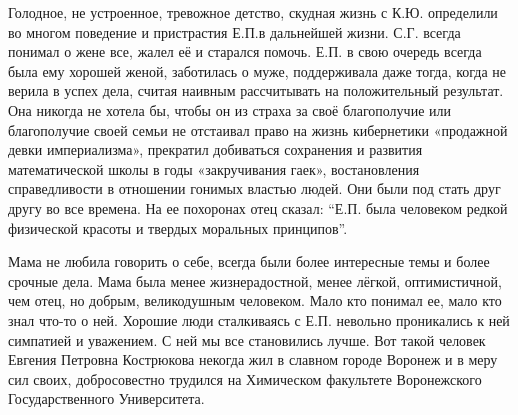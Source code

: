 Голодное, не устроенное, тревожное детство, скудная жизнь с К.Ю. определили во многом поведение и пристрастия Е.П.в дальнейшей жизни. С.Г. всегда понимал о жене все, жалел её и старался помочь. Е.П. в свою очередь всегда была ему хорошей женой, заботилась о муже, поддерживала даже тогда, когда не верила в успех дела, считая наивным рассчитывать на положительный результат. Она никогда не хотела бы, чтобы он из страха за своё благополучие или благополучие своей семьи не отстаивал право на жизнь кибернетики «продажной девки империализма», прекратил добиваться сохранения и развития математической школы в годы «закручивания гаек», востановления справедливости в отношении гонимых властью людей. Они были под стать друг другу во все времена. На ее похоронах отец сказал: “Е.П. была человеком редкой физической красоты и твердых моральных принципов”.

Мама не любила говорить о себе, всегда были более интересные темы и более срочные дела. Мама была менее жизнерадостной, менее лёгкой, оптимистичной, чем отец, но добрым, великодушным человеком. Мало кто понимал ее, мало кто знал что-то о ней. Хорошие люди сталкиваясь с Е.П. невольно проникались к ней симпатией и уважением. С ней мы все становились лучше.
Вот такой человек Евгения Петровна Кострюкова некогда жил в славном городе Воронеж и в меру сил своих, добросовестно трудился на Химическом факультете Воронежского Государственного Университета.
